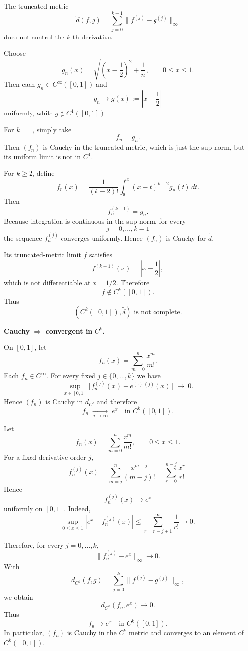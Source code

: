 \begin{solution}
The truncated metric
\[
\widetilde d(f,g)
=
\sum_{j=0}^{k-1}
\|f^{(j)}-g^{(j)}\|_\infty
\]
does not control the \(k\)-th derivative.

Choose
\[
g_n(x)
=
\sqrt{\left(x-\frac12\right)^2+\frac1n},
\qquad 0\le x\le1.
\]
Then each \(g_n\in C^\infty([0,1])\) and
\[
g_n\longrightarrow g(x):=\left|x-\frac12\right|
\]
uniformly, while \(g\notin C^1([0,1])\).

For \(k=1\), simply take
\[
f_n=g_n.
\]
Then \((f_n)\) is Cauchy in the truncated metric, which is just the sup norm, but its uniform limit is not in \(C^1\).

For \(k\ge2\), define
\[
f_n(x)
=
\frac1{(k-2)!}
\int_0^x
(x-t)^{k-2}g_n(t)\,dt.
\]
Then
\[
f_n^{(k-1)}=g_n.
\]
Because integration is continuous in the sup norm, for every
\[
j=0,\ldots,k-1
\]
the sequence \(f_n^{(j)}\) converges uniformly. Hence \((f_n)\) is Cauchy for \(\widetilde d\).

Its truncated-metric limit \(f\) satisfies
\[
f^{(k-1)}(x)=\left|x-\frac12\right|,
\]
which is not differentiable at \(x=1/2\). Therefore
\[
f\notin C^k([0,1]).
\]
Thus
\[
\boxed{
(C^k([0,1]),\widetilde d)\text{ is not complete}.
}
\]
\end{solution}


\begin{problem}[CP-IV-0059]
\label{prob:cp-iv-0059}
\par\noindent\textbullet\quad \textbf{Cauchy $\Rightarrow$ convergent in $C^k$.}

	On $[0,1]$, let
	\[
	f_n(x)=\sum_{m=0}^{n}\frac{x^{m}}{m!}.
	\]
	Each $f_n\in C^\infty$.
	For every fixed $j\in\{0,\dots,k\}$ we have
	\[
	\sup_{x\in[0,1]}\bigl|\,f_n^{(j)}(x)-e^{(\cdot)\,(j)}(x)\,\bigr|\;\longrightarrow\;0.
	\]
	Hence $(f_n)$ is Cauchy in $d_{C^k}$ and therefore
	\[
	f_n \;\xrightarrow[n\to\infty]{}\; e^x \quad\text{in } C^k([0,1]).
	\]

	\medskip
\end{problem}

\begin{solution}
Let
\[
f_n(x)=\sum_{m=0}^{n}\frac{x^m}{m!},
\qquad 0\le x\le1.
\]
For a fixed derivative order \(j\),
\[
f_n^{(j)}(x)
=
\sum_{m=j}^{n}
\frac{x^{m-j}}{(m-j)!}
=
\sum_{r=0}^{n-j}\frac{x^r}{r!}.
\]
Hence
\[
f_n^{(j)}(x)
\longrightarrow
e^x
\]
uniformly on \([0,1]\). Indeed,
\[
\sup_{0\le x\le1}
\left|
e^x-f_n^{(j)}(x)
\right|
\le
\sum_{r=n-j+1}^{\infty}\frac1{r!}
\longrightarrow0.
\]

Therefore, for every \(j=0,\ldots,k\),
\[
\|f_n^{(j)}-e^x\|_\infty\longrightarrow0.
\]
With
\[
d_{C^k}(f,g)
=
\sum_{j=0}^{k}
\|f^{(j)}-g^{(j)}\|_\infty,
\]
we obtain
\[
d_{C^k}(f_n,e^x)\longrightarrow0.
\]
Thus
\[
\boxed{
f_n\to e^x\quad\text{in }C^k([0,1]).
}
\]
In particular, \((f_n)\) is Cauchy in the \(C^k\) metric and converges to an element of \(C^k([0,1])\).
\end{solution}


